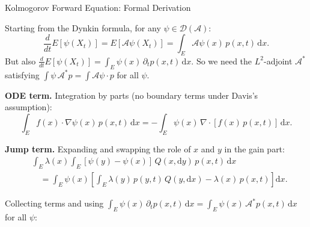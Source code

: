 \documentclass[aspectratio=169]{beamer}
\begin{document}
\begin{frame}{Kolmogorov Forward Equation: Formal Derivation}

  Starting from the Dynkin formula, for any $\psi \in \mathcal{D}(\mathcal{A})$:
  \[
    \frac{d}{dt}E[\psi(X_t)]
    = E[\mathcal{A}\psi(X_t)]
    = \int_E \mathcal{A}\psi(x)\,p(x,t)\,\mathrm{d}x.
  \]
  But also $\frac{d}{dt}E[\psi(X_t)] = \int_E \psi(x)\,\partial_t p(x,t)\,\mathrm{d}x$.
  So we need the $L^2$-adjoint $\mathcal{A}^*$ satisfying
  $\int \psi\,\mathcal{A}^*p = \int \mathcal{A}\psi\cdot p$ for all $\psi$.

  \bigskip
  \textbf{ODE term.} Integration by parts (no boundary terms under
  Davis's assumption):
  \[
    \int_E f(x)\cdot\nabla\psi(x)\,p(x,t)\,\mathrm{d}x
    = -\int_E \psi(x)\,\nabla\cdot[f(x)\,p(x,t)]\,\mathrm{d}x.
  \]

  \textbf{Jump term.} Expanding and swapping the role of $x$ and $y$
  in the gain part:
  \begin{align*}
    &\int_E \lambda(x)\!\int_E[\psi(y){-}\psi(x)]\,Q(x,\mathrm{d}y)\,p(x,t)\,\mathrm{d}x \\
    &\quad= \int_E\psi(x)\!\left[\int_E\lambda(y)\,p(y,t)\,Q(y,\mathrm{d}x)
      - \lambda(x)\,p(x,t)\right]\mathrm{d}x.
  \end{align*}

  \bigskip
  Collecting terms and using $\int_E \psi(x)\,\partial_t p(x,t)\,\mathrm{d}x
  = \int_E \psi(x)\,\mathcal{A}^*p(x,t)\,\mathrm{d}x$ for all $\psi$:

\end{frame}
\end{document}
